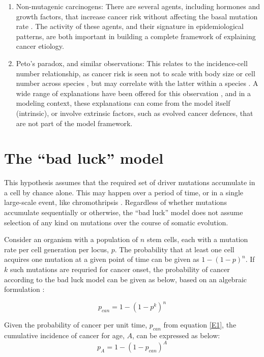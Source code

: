 \documentclass[9pt,twocolumn,twoside]{pnas-new}
\begin{document}
\begin{enumerate}
	\item Non-mutagenic carcinogens: There are several agents, including hormones and growth factors, that increase cancer risk without affecting the basal mutation rate \cite{Tennant1993}. The activity of these agents, and their signature in epidemiological patterns, are both important in building a complete framework of explaining cancer etiology.
	\item Peto's paradox, and similar observations: This relates to the incidence-cell number relationship, as cancer risk is seen not to scale with body size or cell number across species \cite{Nagy2007}, but may correlate with the latter within a species \cite{Noble2015}. A wide range of explanations have been offered for this observation \cite{Tollis2017b}, and in a modeling context, these explanations can come from the model itself (intrinsic), or involve extrinsic factors, such as evolved cancer defences, that are not part of the model framework.
\end{enumerate}


\section{The ``bad luck'' model}

This hypothesis assumes that the required set of driver mutations accumulate in a cell by chance alone. This may happen over a period of time, or in a single large-scale event, like chromothripsis \cite{Stephens2011}. Regardless of whether mutations accumulate sequentially or otherwise, the ``bad luck'' model does not assume selection of any kind on mutations over the course of somatic evolution.

Consider an organism with a population of $n$ stem cells, each with a mutation rate per cell generation per locus, $p$. The probability that at least one cell acquires one mutation at a given point of time can be given as $1-(1-p)^{n}$. If $k$ such mutations are requried for cancer onset, the probability of cancer according to the bad luck model can be given as below, based on an algebraic formulation \cite{Calabrese2010}:

\begin{equation}
	\label{E1}
	p_{can} = 1-(1-p^{k})^{n}
\end{equation}

Given the probability of cancer per unit time, $p_{can}$ from equation \ref{E1}, the cumulative incidence of cancer for age, $A$, can be expressed as below:
\begin{equation}
	\label{E2}
	p_{A} = 1-(1-p_{can})^{A}
\end{equation}
\end{document}
